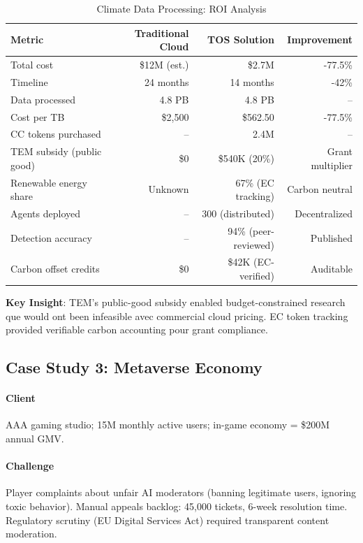 \documentclass[11pt]{article}
\begin{document}
\begin{table}[H]
\centering
\caption{Climate Data Processing: ROI Analysis}
\label{tab:climate-roi}
\begin{tabular}{@{}lrrr@{}}
\toprule
\textbf{Metric} & \textbf{Traditional Cloud} & \textbf{TOS Solution} & \textbf{Improvement} \\ \midrule
Total cost & \$12M (est.) & \$2.7M & -77.5\% \\
Timeline & 24 months & 14 months & -42\% \\
Data processed & 4.8 PB & 4.8 PB & -- \\
Cost per TB & \$2,500 & \$562.50 & -77.5\% \\
CC tokens purchased & -- & 2.4M & -- \\
TEM subsidy (public good) & \$0 & \$540K (20\%) & Grant multiplier \\
Renewable energy share & Unknown & 67\% (EC tracking) & Carbon neutral \\
Agents deployed & -- & 300 (distributed) & Decentralized \\
Detection accuracy & -- & 94\% (peer-reviewed) & Published \\
Carbon offset credits & \$0 & \$42K (EC-verified) & Auditable \\
\bottomrule
\end{tabular}
\end{table}

\textbf{Key Insight}: TEM's public-good subsidy enabled budget-constrained research que would ont been infeasible avec commercial cloud pricing. EC token tracking provided verifiable carbon accounting pour grant compliance.

\subsection{Case Study 3: Metaverse Economy}

\paragraph{Client} AAA gaming studio; 15M monthly active users; in-game economy = \$200M annual GMV.

\paragraph{Challenge} Player complaints about unfair AI moderators (banning legitimate users, ignoring toxic behavior). Manual appeals backlog: 45,000 tickets, 6-week resolution time. Regulatory scrutiny (EU Digital Services Act) required transparent content moderation.
\end{document}
